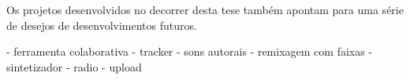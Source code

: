 \begin{citacao}
Os projetos desenvolvidos no decorrer desta tese também apontam para uma série de desejos de desenvolvimentos futuros. 

- ferramenta colaborativa
- tracker
- sons autorais
- remixagem com faixas 
- sintetizador
- radio
- upload




\end{citacao}

